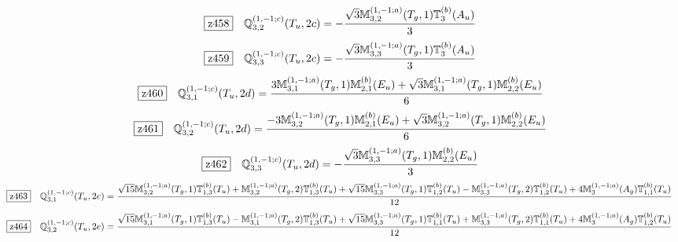 \documentclass[fleqn,10pt,landscape]{jsarticle}
\begin{document}
\begin{dmath*}
\hspace*{3mm}\fbox{z458}\quad \mathbb{Q}_{3,2}^{(1,-1;c)}(T_{u},2c)=- \frac{\sqrt{3} \mathbb{M}_{3,2}^{(1,-1;a)}(T_{g},1) \mathbb{T}_{3}^{(b)}(A_{u})}{3}
\end{dmath*}
\begin{dmath*}
\hspace*{3mm}\fbox{z459}\quad \mathbb{Q}_{3,3}^{(1,-1;c)}(T_{u},2c)=- \frac{\sqrt{3} \mathbb{M}_{3,3}^{(1,-1;a)}(T_{g},1) \mathbb{T}_{3}^{(b)}(A_{u})}{3}
\end{dmath*}
\begin{dmath*}
\hspace*{3mm}\fbox{z460}\quad \mathbb{Q}_{3,1}^{(1,-1;c)}(T_{u},2d)=\frac{3 \mathbb{M}_{3,1}^{(1,-1;a)}(T_{g},1) \mathbb{M}_{2,1}^{(b)}(E_{u}) + \sqrt{3} \mathbb{M}_{3,1}^{(1,-1;a)}(T_{g},1) \mathbb{M}_{2,2}^{(b)}(E_{u})}{6}
\end{dmath*}
\begin{dmath*}
\hspace*{3mm}\fbox{z461}\quad \mathbb{Q}_{3,2}^{(1,-1;c)}(T_{u},2d)=\frac{- 3 \mathbb{M}_{3,2}^{(1,-1;a)}(T_{g},1) \mathbb{M}_{2,1}^{(b)}(E_{u}) + \sqrt{3} \mathbb{M}_{3,2}^{(1,-1;a)}(T_{g},1) \mathbb{M}_{2,2}^{(b)}(E_{u})}{6}
\end{dmath*}
\begin{dmath*}
\hspace*{3mm}\fbox{z462}\quad \mathbb{Q}_{3,3}^{(1,-1;c)}(T_{u},2d)=- \frac{\sqrt{3} \mathbb{M}_{3,3}^{(1,-1;a)}(T_{g},1) \mathbb{M}_{2,2}^{(b)}(E_{u})}{3}
\end{dmath*}
\begin{dmath*}
\hspace*{3mm}\fbox{z463}\quad \mathbb{Q}_{3,1}^{(1,-1;c)}(T_{u},2e)=\frac{\sqrt{15} \mathbb{M}_{3,2}^{(1,-1;a)}(T_{g},1) \mathbb{T}_{1,3}^{(b)}(T_{u}) + \mathbb{M}_{3,2}^{(1,-1;a)}(T_{g},2) \mathbb{T}_{1,3}^{(b)}(T_{u}) + \sqrt{15} \mathbb{M}_{3,3}^{(1,-1;a)}(T_{g},1) \mathbb{T}_{1,2}^{(b)}(T_{u}) - \mathbb{M}_{3,3}^{(1,-1;a)}(T_{g},2) \mathbb{T}_{1,2}^{(b)}(T_{u}) + 4 \mathbb{M}_{3}^{(1,-1;a)}(A_{g}) \mathbb{T}_{1,1}^{(b)}(T_{u})}{12}
\end{dmath*}
\begin{dmath*}
\hspace*{3mm}\fbox{z464}\quad \mathbb{Q}_{3,2}^{(1,-1;c)}(T_{u},2e)=\frac{\sqrt{15} \mathbb{M}_{3,1}^{(1,-1;a)}(T_{g},1) \mathbb{T}_{1,3}^{(b)}(T_{u}) - \mathbb{M}_{3,1}^{(1,-1;a)}(T_{g},2) \mathbb{T}_{1,3}^{(b)}(T_{u}) + \sqrt{15} \mathbb{M}_{3,3}^{(1,-1;a)}(T_{g},1) \mathbb{T}_{1,1}^{(b)}(T_{u}) + \mathbb{M}_{3,3}^{(1,-1;a)}(T_{g},2) \mathbb{T}_{1,1}^{(b)}(T_{u}) + 4 \mathbb{M}_{3}^{(1,-1;a)}(A_{g}) \mathbb{T}_{1,2}^{(b)}(T_{u})}{12}
\end{dmath*}
\end{document}
